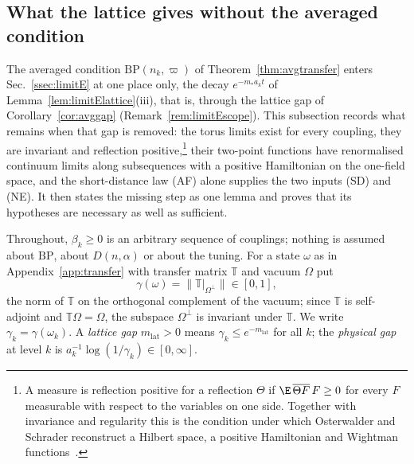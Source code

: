\subsection{What the lattice gives without the averaged condition}
\label{ssec:rEunconditional}

The averaged condition $\mathrm{BP}(n_k,\varpi)$ of
Theorem~\ref{thm:avgtransfer} enters Sec.~\ref{ssec:limitE} at one place
only, the decay $e^{-m_*a_kt}$ of Lemma~\ref{lem:limitElattice}(iii), that
is, through the lattice gap of Corollary~\ref{cor:avggap}
(Remark~\ref{rem:limitEscope}). This subsection records what remains when
that gap is removed: the torus limits exist for every coupling, they are
invariant and reflection positive,\footnote{A measure is reflection positive for a reflection $\Theta$ if $\E\,\overline{\Theta F}\,F\ge0$ for every $F$ measurable with respect to the variables on one side. Together with invariance and regularity this is the condition under which Osterwalder and Schrader reconstruct a Hilbert space, a positive Hamiltonian and Wightman functions~\cite{OS73,OS75}.} their two-point functions have
renormalised continuum limits along subsequences with a positive Hamiltonian
on the one-field space, and the short-distance law (AF) alone supplies the
two inputs (SD) and (NE). It then states the missing step as one lemma and
proves that its hypotheses are necessary as well as sufficient.

Throughout, $\beta_k\ge0$ is an arbitrary sequence of couplings; nothing is
assumed about $\mathrm{BP}$, about $D(n,\alpha)$ or about the tuning. For a
state $\omega$ as in Appendix~\ref{app:transfer} with transfer matrix
$\mathbb T$ and vacuum $\Omega$ put
\[
\gamma(\omega)=\bigl\|\mathbb T|_{\Omega^\perp}\bigr\|\in[0,1],
\]
the norm of $\mathbb T$ on the orthogonal complement of the vacuum; since
$\mathbb T$ is self-adjoint and $\mathbb T\Omega=\Omega$, the subspace
$\Omega^\perp$ is invariant under $\mathbb T$. We write $\gamma_k=\gamma(
\omega_k)$. A \emph{lattice gap} $m_{\mathrm{lat}}>0$ means $\gamma_k\le
e^{-m_{\mathrm{lat}}}$ for all $k$; the \emph{physical gap} at level $k$ is
$a_k^{-1}\log(1/\gamma_k)\in[0,\infty]$.

